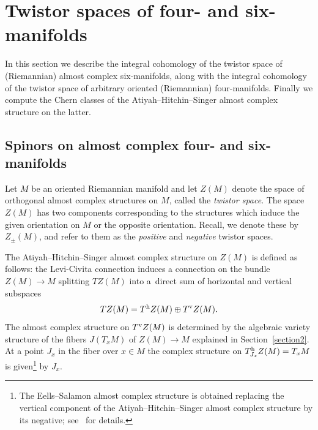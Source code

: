 \documentclass[pdftex]{sigma}%
\numberwithin{equation}{section}
\begin{document}
\section{Twistor spaces of four- and six-manifolds}\label{section3}

In this section we describe the integral cohomology of the twistor space of (Riemannian) almost complex six-manifolds, along with the integral cohomology of the twistor space of arbitrary oriented (Riemannian) four-manifolds. Finally we compute the Chern classes of the Atiyah--Hitchin--Singer almost complex structure on the latter.

\subsection{Spinors on almost complex four- and six-manifolds}

Let $M$ be an oriented Riemannian manifold and let $Z(M)$ denote the space of orthogonal almost complex structures on $M$, called the \emph{twistor space}. The space
$Z(M)$ has two components corresponding to the structures which induce the given orientation on $M$ or the opposite orientation. Recall, we
denote these by $Z_{\pm}(M)$, and refer to them as the \emph{positive} and \emph{negative} twistor spaces.

The Atiyah--Hitchin--Singer almost complex structure on $Z(M)$ is defined as follows: the Levi-Civita connection induces a connection on the bundle $Z(M) \to M$ splitting $TZ(M)$ into a~direct sum of horizontal and vertical subspaces
\[
TZ(M) =T^{\rm h} Z(M) \oplus T^{\rm v}Z(M).
\]
The almost complex structure on $T^{\rm v} Z(M)$ is determined by the algebraic variety structure of the fibers $J(T_x M)$ of $Z(M) \to M$ explained in Section~\ref{section2}. At a point $J_x$ in the fiber
over $x\in M$ the complex structure on $T^{\rm h}_{J_x} Z(M) = T_x M$ is given\footnote{The Eells--Salamon almost complex structure is obtained replacing the vertical component of the Atiyah--Hitchin--Singer almost complex structure by its negative; see~\cite[Section~3]{Sa84} for details.} by $J_x$.
\end{document}
